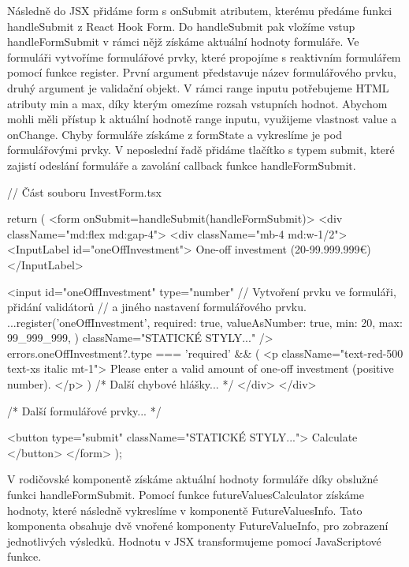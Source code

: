 Následně do JSX přidáme form s onSubmit atributem, kterému předáme funkci handleSubmit z React Hook Form. Do handleSubmit pak vložíme vstup handleFormSubmit v rámci nějž získáme aktuální hodnoty formuláře. 
Ve formuláři vytvoříme formulářové prvky, které propojíme s reaktivním formulářem pomocí funkce register. První argument představuje název formulářového prvku, druhý argument je validační objekt. 
V rámci range inputu potřebujeme HTML atributy min a max, díky kterým omezíme rozsah vstupních hodnot. Abychom mohli měli přístup k aktuální hodnotě range inputu, využijeme vlastnost value a onChange. 
Chyby formuláře získáme z formState a vykreslíme je pod formulářovými prvky. V neposlední řadě přidáme tlačítko s typem submit, které zajistí odeslání formuláře a zavolání callback funkce handleFormSubmit.

\begin{prog}
// Část souboru InvestForm.tsx

return (
  <form onSubmit={handleSubmit(handleFormSubmit)}>
    <div className="md:flex md:gap-4">
      <div className="mb-4 md:w-1/2">
        <InputLabel id="oneOffInvestment">
          One-off investment (20-99.999.999€)
        </InputLabel>

        <input
          id="oneOffInvestment"
          type="number"
          // Vytvoření prvku ve formuláři, přidání validátorů 
          // a jiného nastavení formulářového prvku.
          {...register('oneOffInvestment', {
            required: true,
            valueAsNumber: true,
            min: 20,
            max: 99_999_999,
          })}
          className="STATICKÉ STYLY..."
        />
        {errors.oneOffInvestment?.type === 'required' && (
          <p className="text-red-500 text-xs italic mt-1">
            Please enter a valid amount of one-off investment (positive number).
          </p>
        )}
        {/* Další chybové hlášky... */}
      </div>
    </div>

    {/* Další formulářové prvky... */}

    <button type="submit" className="STATICKÉ STYLY...">
      Calculate
    </button>
  </form>
);
\end{prog}

V rodičovské komponentě získáme aktuální hodnoty formuláře díky obslužné funkci handleFormSubmit. Pomocí funkce futureValuesCalculator získáme hodnoty, které následně vykreslíme v komponentě FutureValuesInfo. 
Tato komponenta obsahuje dvě vnořené komponenty FutureValueInfo, pro zobrazení jednotlivých výsledků. Hodnotu v JSX transformujeme pomocí JavaScriptové funkce.

